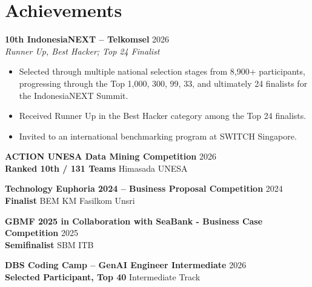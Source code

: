 \section*{Achievements}

\textbf{10th IndonesiaNEXT -- Telkomsel} \hfill 2026\\
\textit{Runner Up, Best Hacker; Top 24 Finalist}

\begin{itemize}
    \item Selected through multiple national selection stages from
    8,900+ participants, progressing through the Top 1,000, 300, 99,
    33, and ultimately 24 finalists for the IndonesiaNEXT Summit.
    
    \item Received Runner Up in the Best Hacker category among the
    Top 24 finalists.
    
    \item Invited to an international benchmarking program at SWITCH
    Singapore.
\end{itemize}

\textbf{ACTION UNESA Data Mining Competition} \hfill 2026\\
\textbf{Ranked 10th / 131 Teams} \hfill Himasada UNESA

\textbf{Technology Euphoria 2024 -- Business Proposal Competition} \hfill 2024\\
\textbf{Finalist} \hfill BEM KM Fasilkom Unsri

\textbf{GBMF 2025 in Collaboration with SeaBank - Business Case Competition} \hfill 2025\\
\textbf{Semifinalist} \hfill SBM ITB

\textbf{DBS Coding Camp -- GenAI Engineer Intermediate} \hfill 2026\\
\textbf{Selected Participant, Top 40} \hfill Intermediate Track